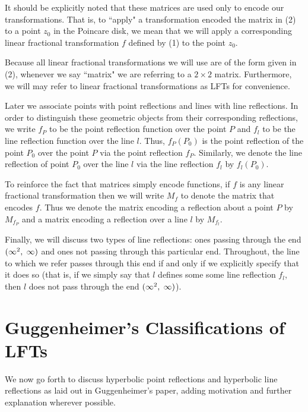 \documentclass[12pt]{article}
\newcommand{\ttc}{, \hspace{1mm}}
\newcommand{\specialend}{(\infty^2\ttc\infty)}
\theoremstyle{plain}
\theoremstyle{definition}
\begin{document}
It should be explicitly noted that these matrices are used only to encode our transformations. That is, to ``apply" a transformation encoded the matrix in (2) to a point $z_0$ in the Poincare disk, we mean that we will apply a corresponding linear fractional transformation $f$ defined by (1) to the point $z_0$. 

Because all linear fractional transformations we will use are of the form given in (2), whenever we say ``matrix" we are referring to a $2 \times 2$ matrix. Furthermore, we will may refer to linear fractional transformations as LFTs for convenience. 

Later we associate points with point reflections and lines with line reflections. In order to distinguish these geometric objects from their corresponding reflections, we write $f_P$ to be the point reflection function over the point $P$ and $f_l$ to be the line reflection function over the line $l$. Thus, $f_P(P_0)$ is the point reflection of the point $P_0$ over the point $P$ via the point reflection $f_P$. Similarly, we denote the line reflection of point $P_0$ over the line $l$ via the line reflection $f_l$ by $f_l(P_0)$.

To reinforce the fact that matrices simply encode functions, if $f$ is any linear fractional transformation then we will write $M_f$ to denote the matrix that encodes $f$. Thus we denote the matrix encoding a reflection about a point $P$ by $M_{f_P}$ and a matrix encoding a reflection over a line $l$ by $M_{f_l}$. 

Finally, we will discuss two types of line reflections: ones passing through the end $\specialend$ and ones not passing through this particular end. Throughout, the line to which we refer passes through this end if and only if we explicitly specify that it does so (that is, if we simply say that $l$ defines some some line reflection $f_l$, then $l$ does not pass through the end $\specialend$).

\section{Guggenheimer's Classifications of LFTs}

\hspace{10mm} We now go forth to discuss hyperbolic point reflections and hyperbolic line reflections as laid out in Guggenheimer's paper, adding motivation and further explanation wherever possible. 
\end{document}
